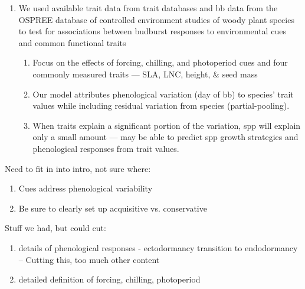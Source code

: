 \documentclass{article}
\begin{document}
\begin{enumerate}
\item We used available trait data from trait databases and bb data from the OSPREE database of controlled environment studies of woody plant species to test for associations between budburst responses to environmental cues and common functional traits
\begin{enumerate}
\item Focus on the effects of forcing, chilling, and photoperiod cues and four commonly measured traits — SLA, LNC, height, \& seed mass
\item Our model attributes phenological variation (day of bb) to species’ trait values while including residual variation from species (partial-pooling).
\item When traits explain a significant portion of the variation, spp will explain only a small amount — may be able to predict spp growth strategies and phenological responses from trait values.
\end{enumerate}

\end{enumerate}

Need to fit in into intro, not sure where:
\begin{enumerate}
\item Cues address phenological variability
\item Be sure to clearly set up acquisitive vs. conservative
\end{enumerate}

Stuff we had, but could cut:
\begin{enumerate}
\item details of phenological responses - ectodormancy transition to endodormancy -- Cutting this, too much other content
\item detailed definition of forcing, chilling, photoperiod
\end{enumerate}
\end{document}
